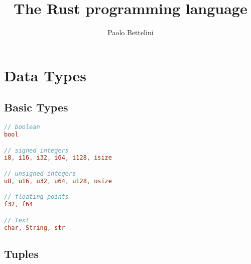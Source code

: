 \documentclass{article}
\title{The Rust programming language}
\author{Paolo Bettelini}
\date{}
\begin{document}
\maketitle
\tableofcontents
\pagebreak

\section{Data Types}

\subsection{Basic Types}


\begin{lstlisting}[language=Rust, style=boxed, numbers=none]
// boolean
bool

// signed integers
i8, i16, i32, i64, i128, isize

// unsigned integers
u8, u16, u32, u64, u128, usize

// floating points
f32, f64

// Text
char, String, str
\end{lstlisting}

\subsection{Tuples}
\end{document}
